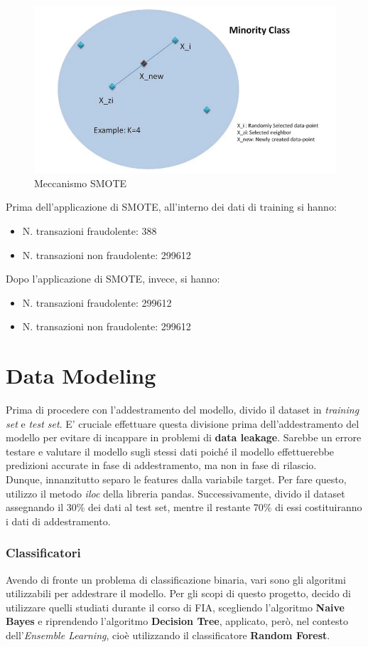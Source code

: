 \documentclass[]{article}
\begin{document}
            \begin{figure}[H]
                \centering
                \includegraphics[width=.45\textwidth]{img/SMOTE.png}
                \caption[short]{Meccanismo SMOTE}
            \end{figure}
            Prima dell'applicazione di SMOTE, all'interno dei dati di training si hanno:
            \begin{itemize}
                \item N. transazioni fraudolente: 388
                \item N. transazioni non fraudolente: 299612
            \end{itemize}
            Dopo l'applicazione di SMOTE, invece, si hanno:
            \begin{itemize}
                \item N. transazioni fraudolente: 299612
                \item N. transazioni non fraudolente: 299612
            \end{itemize}

\section{Data Modeling}
    Prima di procedere con l'addestramento del modello, divido il dataset in \textit{training set} e \textit{test set}. E' cruciale effettuare questa divisione prima dell'addestramento del modello per evitare di incappare in problemi di \textbf{data leakage}. Sarebbe un errore testare e valutare il modello sugli stessi dati poiché il modello effettuerebbe predizioni accurate in fase di addestramento, ma non in fase di rilascio.\\
    Dunque, innanzitutto separo le features dalla variabile target. Per fare questo, utilizzo il metodo \textit{iloc} della libreria pandas.
    Successivamente, divido il dataset assegnando il 30\% dei dati al test set, mentre il restante 70\% di essi costituiranno i dati di addestramento.
    \subsubsection{Classificatori}
        Avendo di fronte un problema di classificazione binaria, vari sono gli algoritmi utilizzabili per addestrare il modello. Per gli scopi di questo progetto, decido di utilizzare quelli studiati durante il corso di FIA, scegliendo l'algoritmo \textbf{Naive Bayes} e riprendendo l'algoritmo \textbf{Decision Tree}, applicato, però, nel contesto dell'\textit{Ensemble Learning}, cioè utilizzando il classificatore \textbf{Random Forest}.
\end{document}
